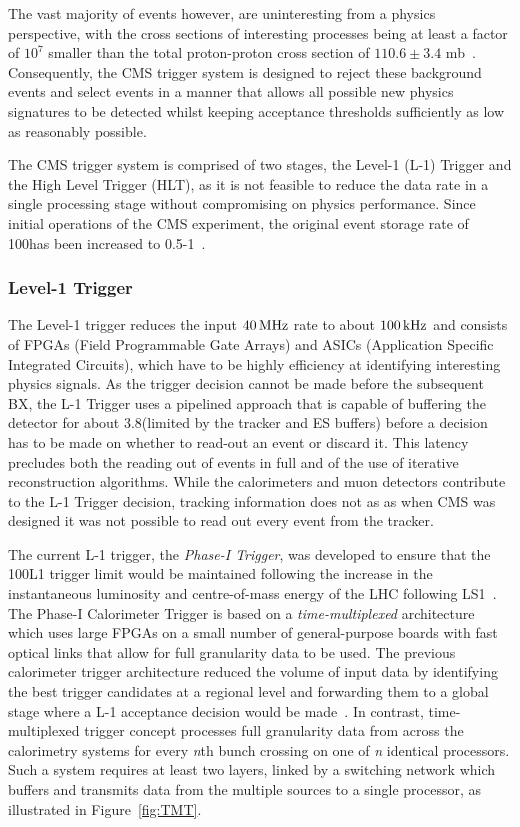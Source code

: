 The vast majority of events however, are uninteresting from a physics perspective, with the cross sections of interesting processes being at least a factor of $10^{7}$ smaller than the total proton-proton cross section of $110.6 \pm 3.4$ mb~\cite{Antchev:2017dia}.
Consequently, the CMS trigger system is designed to reject these background events and select events in a manner that allows all possible new physics signatures to be detected whilst keeping acceptance thresholds sufficiently as low as reasonably possible.

The CMS trigger system is comprised of two stages, the Level-1 (L-1) Trigger and the High Level Trigger (HLT), as it is not feasible to reduce the data rate in a single processing stage without compromising on physics performance.
Since initial operations of the CMS experiment, the original event storage rate of 100\Hz has been increased to 0.5-1\kHz~\cite{Dasu:2000ge,phase1L1TDR}.

\subsubsection{Level-1 Trigger}\label{paragraph:L1}
The Level-1 trigger reduces the input $40\text{\,MHz}$ rate to about $100\text{\,kHz}$ and consists of FPGAs (Field Programmable Gate Arrays) and ASICs (Application Specific Integrated Circuits), which have to be highly efficiency at identifying interesting physics signals.
As the trigger decision cannot be made before the subsequent BX, the L-1 Trigger uses a pipelined approach that is capable of buffering the detector for about 3.8\mus (limited by the tracker and ES buffers) before a decision has to be made on whether to read-out an event or discard it. 
This latency precludes both the reading out of events in full and of the use of iterative reconstruction algorithms.
While the calorimeters and muon detectors contribute to the L-1 Trigger decision, tracking information does not as as when CMS was designed it was not possible to read out every event from the tracker.

The current L-1 trigger, the \emph{Phase-I Trigger}, was developed to ensure that the 100\kHz L1 trigger limit would be maintained following the increase in the instantaneous luminosity and centre-of-mass energy of the LHC following LS1~\cite{phase1L1TDR}.
The Phase-I Calorimeter Trigger is based on a \emph{time-multiplexed} architecture which uses large FPGAs on a small number of general-purpose boards with fast optical links that allow for full granularity data to be used.
The previous calorimeter trigger architecture reduced the volume of input data by identifying the best trigger candidates at a regional level and forwarding them to a global stage where a L-1 acceptance decision would be made~\cite{phase1L1TDR}.
In contrast, time-multiplexed trigger concept processes full granularity data from across the calorimetry systems for every \emph{n}th bunch crossing on one of \emph{n} identical processors.
Such a system requires at least two layers, linked by a switching network which buffers and transmits data from the multiple sources to a single processor, as illustrated in Figure~\ref{fig:TMT}.

